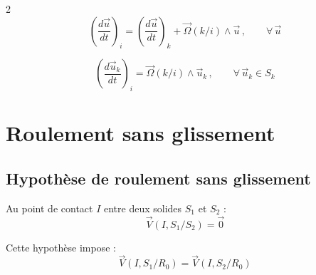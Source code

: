 \documentclass[10pt,a4paper]{article}
\renewcommand{\vec}{\overrightarrow}
\begin{document}
\begin{multicols}{2}
        \[
        \left( \frac{d\vec u}{dt} \right)_{i}
        =  \left( \frac{d\vec u}{dt} \right)_{k} + \vec\Omega(k/i) \wedge \vec u \, , \qquad \forall \, \vec u
        \]

        \[
        \left( \frac{d\vec u_k}{dt} \right)_{i}
        = \vec\Omega(k/i) \wedge \vec u_k \, , \qquad \forall \, \vec u_k \in S_k
        \]

    \section{Roulement sans glissement}

        \subsection{Hypothèse de roulement sans glissement}
        Au point de contact $I$ entre deux solides $S_1$ et $S_2$ :
        \[
        \vec V(I, S_1/S_2) = \vec 0
        \]

        Cette hypothèse impose :
        \[
        \vec V(I, S_1/R_0) = \vec V(I, S_2/R_0)
        \]

    \end{multicols}

    
\end{document}
